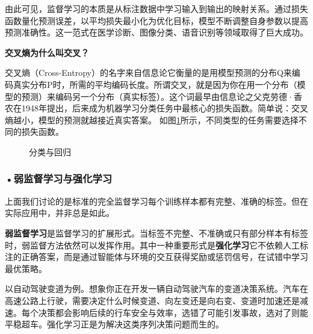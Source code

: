 由此可见，监督学习的本质是从标注数据中学习输入到输出的映射关系。通过损失函数量化预测误差，以平均损失最小化为优化目标，模型不断调整自身参数以提高预测准确性。这一范式在医学诊断、图像分类、语音识别等领域取得了巨大成功。

\begin{knowledgebox}
\small
\textbf{交叉熵为什么叫交叉？}

交叉熵（Cross-Entropy）的名字来自信息论它衡量的是用模型预测的分布Q来编码真实分布P时，所需的平均编码长度。所谓交叉，就是因为你在用一个分布（模型的预测）来编码另一个分布（真实标签）。这个词最早由信息论之父克劳德·香农在1948年提出，后来成为机器学习分类任务中最核心的损失函数。简单说：交叉熵越小，模型的预测就越接近真实答案。
如图\ref{fig:ch2_2_3}所示，不同类型的任务需要选择不同的损失函数。

\end{knowledgebox}

\begin{figure}[H]
\centering
{}
\caption{分类与回归}
\label{fig:ch2_2_3}
\end{figure}



\subsubsection*{\textbf{•弱监督学习与强化学习}}

上面我们讨论的是标准的完全监督学习每个训练样本都有完整、准确的标签。但在实际应用中，并非总是如此。

\textbf{弱监督学习}是监督学习的扩展形式。当标签不完整、不准确或只有部分样本有标签时，弱监督方法依然可以发挥作用。其中一种重要形式是\textbf{强化学习}它不依赖人工标注的正确答案，而是通过智能体与环境的交互获得奖励或惩罚信号，在试错中学习最优策略。

以自动驾驶变道为例。想象你正在开发一辆自动驾驶汽车的变道决策系统。汽车在高速公路上行驶，需要决定什么时候变道、向左变还是向右变、变道时加速还是减速。每个决策都会影响后续的行车安全与效率，选错了可能引发事故，选对了则能平稳超车。强化学习正是为解决这类序列决策问题而生的。

